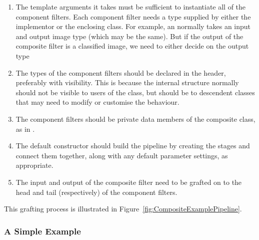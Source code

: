 \begin{enumerate}

\item The template arguments it takes must be sufficient to instantiate all
  of the component filters.  Each component filter needs a type supplied by
  either the implementor or the enclosing class.  For example, an
   normally takes an input and output image type
  (which may be the same).  But if the output of the composite filter is a
  classified image, we need to either decide on the output type

\item The types of the component filters should be declared in the header,
  preferably with  visibility.  This is because the
  internal structure normally should not be visible to users of the class,
  but should be to descendent classes that may need to modify or customise
  the behaviour. 

\item The component filters should be private data members of the composite
  class, as in . 

\item The default constructor should build the pipeline by creating the
  stages and connect them together, along with any default parameter
  settings, as appropriate. 

\item The input and output of the composite filter need to be grafted on to
  the head and tail (respectively) of the component filters. 

\end{enumerate}

This grafting process is illustrated in Figure~\ref{fig:CompositeExamplePipeline}. 

\subsubsection{A Simple Example}



